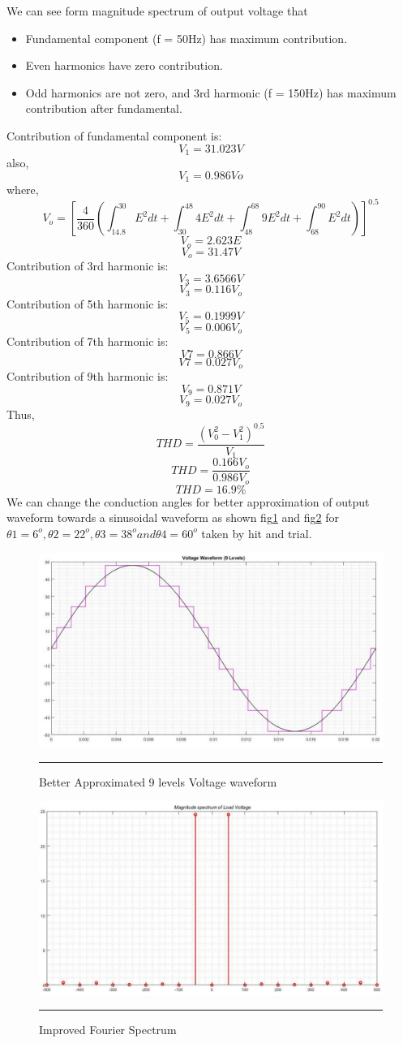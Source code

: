We can see form magnitude spectrum of output voltage that
\begin{itemize}
\item Fundamental component (f = 50Hz) has maximum contribution.
\item Even harmonics have zero contribution.
\item Odd harmonics are not zero, and 3rd harmonic (f = 150Hz) has maximum contribution after fundamental.
\end{itemize}
Contribution of fundamental component is:
$$V_1 = 31.023V$$also,$$ V_1 = 0.986Vo$$ 
where,
$$V_o=[\frac{4}{360}(\int_{14.8}^{30}E^2dt+\int_{30}^{48}4E^2dt+\int_{48}^{68}9E^2dt+\int_{68}^{90}E^2dt)]^{0.5}$$
$$V_o = 2.623E$$
$$V_o = 31.47V$$
Contribution of 3rd harmonic is:
$$V_3 = 3.6566V$$
$$V_3 = 0.116V_o$$
Contribution of 5th harmonic is:
$$V_5 = 0.1999V$$
$$V_5 = 0.006V_o$$
Contribution of 7th harmonic is:
$$V7 = 0.866V$$
$$V7 = 0.027V_o$$
Contribution of 9th harmonic is:
$$V_9 = 0.871V$$
$$V_9 = 0.027V_o$$
Thus,
$$THD=\frac{(V_{0}^{2}-V_{1}^{2})^{0.5}}{V_1}$$
$$THD=\frac{0.166V_o}{0.986V_o}$$
$$THD=16.9\%$$
We can change the conduction angles for better approximation of output waveform towards a sinusoidal waveform as shown fig\ref{fig:6} and fig\ref{fig:7} for $\theta1= 6^o, \theta2 = 22^o, \theta3 = 38^o and \theta4 = 60^o $ taken by hit and trial.
\begin{figure}[htbp]
	\centering
		\includegraphics[width = 5in]{./Figures/better.pdf}
		\rule{35em}{5pt}
	\caption{Better Approximated 9 levels Voltage waveform}
	\label{fig:6}
\end{figure}
\begin{figure}[htbp]
	\centering
		\includegraphics[width = 5in]{./Figures/imp.pdf}
		\rule{35em}{5pt}
	\caption{Improved Fourier Spectrum}
	\label{fig:7}
\end{figure}
